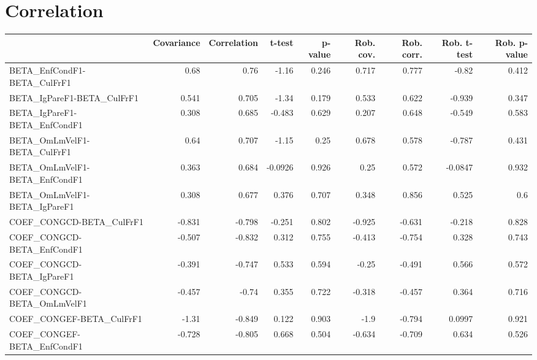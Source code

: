 \section{Correlation}
\begin{tabular}{lrrrrrrrr}
\toprule
{} &  Covariance &  Correlation &  t-test &  p-value &  Rob. cov. &  Rob. corr. &  Rob. t-test &  Rob. p-value \\
\midrule
BETA\_EnfCondF1-BETA\_CulFrF1           &        0.68 &         0.76 &   -1.16 &    0.246 &      0.717 &       0.777 &        -0.82 &         0.412 \\
BETA\_IgPareF1-BETA\_CulFrF1            &       0.541 &        0.705 &   -1.34 &    0.179 &      0.533 &       0.622 &       -0.939 &         0.347 \\
BETA\_IgPareF1-BETA\_EnfCondF1          &       0.308 &        0.685 &  -0.483 &    0.629 &      0.207 &       0.648 &       -0.549 &         0.583 \\
BETA\_OmLmVelF1-BETA\_CulFrF1           &        0.64 &        0.707 &   -1.15 &     0.25 &      0.678 &       0.578 &       -0.787 &         0.431 \\
BETA\_OmLmVelF1-BETA\_EnfCondF1         &       0.363 &        0.684 & -0.0926 &    0.926 &       0.25 &       0.572 &      -0.0847 &         0.932 \\
BETA\_OmLmVelF1-BETA\_IgPareF1          &       0.308 &        0.677 &   0.376 &    0.707 &      0.348 &       0.856 &        0.525 &           0.6 \\
COEF\_CONGCD-BETA\_CulFrF1              &      -0.831 &       -0.798 &  -0.251 &    0.802 &     -0.925 &      -0.631 &       -0.218 &         0.828 \\
COEF\_CONGCD-BETA\_EnfCondF1            &      -0.507 &       -0.832 &   0.312 &    0.755 &     -0.413 &      -0.754 &        0.328 &         0.743 \\
COEF\_CONGCD-BETA\_IgPareF1             &      -0.391 &       -0.747 &   0.533 &    0.594 &      -0.25 &      -0.491 &        0.566 &         0.572 \\
COEF\_CONGCD-BETA\_OmLmVelF1            &      -0.457 &        -0.74 &   0.355 &    0.722 &     -0.318 &      -0.457 &        0.364 &         0.716 \\
COEF\_CONGEF-BETA\_CulFrF1              &       -1.31 &       -0.849 &   0.122 &    0.903 &       -1.9 &      -0.794 &       0.0997 &         0.921 \\
COEF\_CONGEF-BETA\_EnfCondF1            &      -0.728 &       -0.805 &   0.668 &    0.504 &     -0.634 &      -0.709 &        0.634 &         0.526 \\

\end{tabular}
